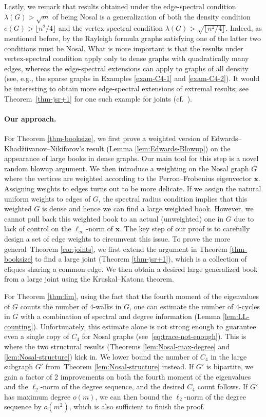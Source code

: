 \documentclass[11pt,a4paper]{article}
\theoremstyle{definition}
\theoremstyle{remark}
\begin{document}
Lastly, we remark that results obtained under the edge-spectral condition $\lambda(G)>\sqrt{m}$ of being Nosal is a generalization of both the density condition $e(G)>\lfloor n^2/4 \rfloor$ and the vertex-spectral condition $\lambda(G)>\sqrt{\lfloor n^2/4 \rfloor}$. Indeed, as mentioned before, by the Rayleigh formula graphs satisfying one of the latter two conditions must be Nosal. What is more important is that the results under vertex-spectral condition apply only to dense graphs with quadratically many edges, whereas the edge-spectral extensions can apply to graphs of all density (see, e.g., the sparse graphs in Examples \ref{exam-C4-1} and \ref{exam-C4-2}). It would be interesting to obtain more edge-spectral extensions of extremal results; see Theorem~\ref{thm-jsr+1} for one such example for joints (cf.~).

\paragraph{Our approach.} For Theorem \ref{thm-booksize}, we first prove a weighted version of 
Edwards--Khad\v{z}iivanov--Nikiforov's result (Lemma \ref{lem:Edwards-Blowup}) on the appearance of large books in dense graphs. Our main tool for this step is a novel random blowup argument. We then introduce a weighting on the Nosal graph $G$ where the vertices are weighted according to the Perron--Frobenius eigenvector $\bm{x}$. Assigning weights to edges turns out to be more delicate. If we assign the natural uniform weights to edges of $G$, the spectral radius condition implies that this weighted $G$ is dense and hence we can find a large weighted book. However, we cannot pull back this weighted book to an actual (unweighted) one in $G$ due to lack of control on the $\ell_{\infty}$-norm of $\bm{x}$. The key step of our proof is to carefully design a set of edge weights to circumvent this issue. To prove the more general~Theorem \ref{cor:joints}, we first extend the argument in Theorem \ref{thm-booksize} to find a large joint (Theorem \ref{thm-jsr+1}), which is a collection of cliques sharing a common edge. We then obtain a desired large generalized book from a large joint using the Kruskal--Katona theorem. 

For Theorem \ref{thm:lim}, using the fact that the fourth moment of the eigenvalues of $G$ counts the number of $4$-walks in $G$, one can estimate the number of $4$-cycles in $G$ with a combination of spectral and degree information (Lemma \ref{lem:LL-counting}). Unfortunately, this estimate alone is not strong enough to guarantee even a single copy of $C_4$ for Nosal graphs (see~\cref{eq:trace-not-enough}). This is where the two structural results (Theorems \ref{lem:Nosal-max-degree} and \ref{lem:Nosal-structure}) kick in. We lower bound the number of $C_4$ in the large subgraph $G'$ from~Theorem \ref{lem:Nosal-structure} instead. If $G'$ is bipartite, we gain a factor of 2 improvements on both the fourth moment of the eigenvalues and the $\ell_2$-norm of the degree sequence, and the desired $C_4$ count follows. If $G'$ has maximum degree $o(m)$, we can then bound the  $\ell_2$-norm of the degree sequence by $o(m^2)$, which is also sufficient to finish the proof.
\end{document}
